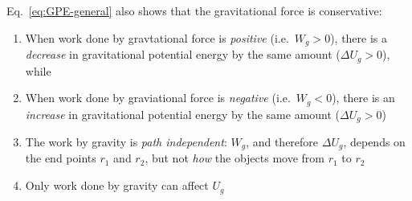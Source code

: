 %  





Eq.~\ref{eq:GPE-general} also shows that the gravitational force is
conservative:

\begin{enumerate} %
\item When work done by gravtational force is \emph{positive} (i.e.\
  $W_g>0$), there is a \emph{decrease} in gravitational potential energy by
  the same amount ($\Delta U_g>0$), while
\item When work done by graviational force is \emph{negative} (i.e.\
  $W_g<0$), there is an \emph{increase} in gravitational potential energy by
  the same amount ($\Delta U_g>0$)
\item The work by gravity is \emph{path independent}: $W_g$, and therefore
  $\Delta U_g$, depends on the end points $r_1$ and $r_2$, but not \emph{how}
  the objects move from $r_1$ to $r_2$
  \item Only work done by gravity can affect $U_g$
\end{enumerate}





